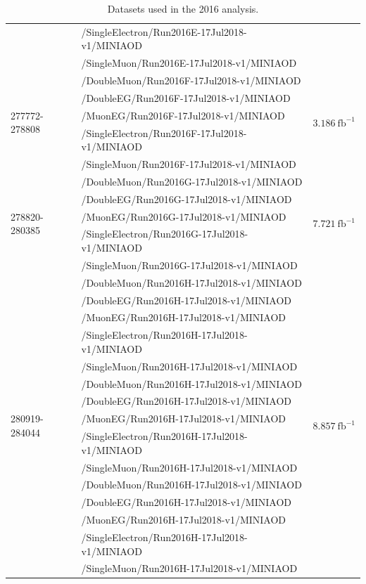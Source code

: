 \begin{table}[h]
\begin{tabular}{|l|l|l|}
          	& /SingleElectron/Run2016E-17Jul2018-v1/MINIAOD &  \\ 
		& /SingleMuon/Run2016E-17Jul2018-v1/MINIAOD &  \\ 
		\hline
		\multirow{5}{*}{277772-278808} & /DoubleMuon/Run2016F-17Jul2018-v1/MINIAOD &  \multirow{5}{*}{$3.186\ \text{fb}^{-1}$} \\ 
		& /DoubleEG/Run2016F-17Jul2018-v1/MINIAOD &  \\ 
		& /MuonEG/Run2016F-17Jul2018-v1/MINIAOD &  \\ 
		& /SingleElectron/Run2016F-17Jul2018-v1/MINIAOD &  \\ 
		& /SingleMuon/Run2016F-17Jul2018-v1/MINIAOD &  \\ 
		\hline
		\multirow{5}{*}{278820-280385} & /DoubleMuon/Run2016G-17Jul2018-v1/MINIAOD &  \multirow{5}{*}{$7.721\ \text{fb}^{-1}$} \\ 
		& /DoubleEG/Run2016G-17Jul2018-v1/MINIAOD &  \\ 
		& /MuonEG/Run2016G-17Jul2018-v1/MINIAOD &  \\ 
		& /SingleElectron/Run2016G-17Jul2018-v1/MINIAOD &  \\ 
		& /SingleMuon/Run2016G-17Jul2018-v1/MINIAOD &  \\ 
		\hline
		\multirow{15}{*}{280919-284044} & /DoubleMuon/Run2016H-17Jul2018-v1/MINIAOD &  \multirow{15}{*}{$8.857\ \text{fb}^{-1}$} \\ 
		& /DoubleEG/Run2016H-17Jul2018-v1/MINIAOD &  \\ 
		& /MuonEG/Run2016H-17Jul2018-v1/MINIAOD &  \\ 
		& /SingleElectron/Run2016H-17Jul2018-v1/MINIAOD &  \\ 
		& /SingleMuon/Run2016H-17Jul2018-v1/MINIAOD &  \\ 
		& /DoubleMuon/Run2016H-17Jul2018-v1/MINIAOD &  \\ 
		& /DoubleEG/Run2016H-17Jul2018-v1/MINIAOD &  \\ 
		& /MuonEG/Run2016H-17Jul2018-v1/MINIAOD &  \\ 
		& /SingleElectron/Run2016H-17Jul2018-v1/MINIAOD &  \\ 
		& /SingleMuon/Run2016H-17Jul2018-v1/MINIAOD &  \\ 
		& /DoubleMuon/Run2016H-17Jul2018-v1/MINIAOD &  \\ 
		& /DoubleEG/Run2016H-17Jul2018-v1/MINIAOD &  \\ 
		& /MuonEG/Run2016H-17Jul2018-v1/MINIAOD &  \\ 
	        & /SingleElectron/Run2016H-17Jul2018-v1/MINIAOD &  \\ 
		& /SingleMuon/Run2016H-17Jul2018-v1/MINIAOD &  \\ 
		\hline %
		\hline %
	\end{tabular}
	\small
	\caption{ Datasets used in the 2016 analysis. }
	\label{tab:datasets_dataA}
\end{table}


